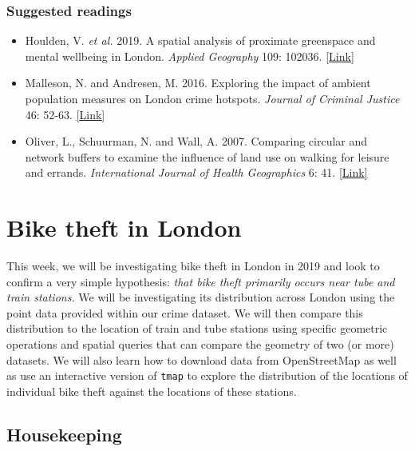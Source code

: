 \documentclass[
]{book}
\providecommand{\tightlist}{%
  \setlength{\itemsep}{0pt}\setlength{\parskip}{0pt}}
\begin{document}
\hypertarget{suggested-readings-5}{%
\subsubsection*{Suggested readings}\label{suggested-readings-5}}

\begin{itemize}
\tightlist
\item
  Houlden, V. \emph{et al.} 2019. A spatial analysis of proximate greenspace and mental wellbeing in London. \emph{Applied Geography} 109: 102036. \href{https://doi.org/10.1016/j.apgeog.2019.102036}{{[}Link{]}}
\item
  Malleson, N. and Andresen, M. 2016. Exploring the impact of ambient population measures on London crime hotspots. \emph{Journal of Criminal Justice} 46: 52-63. \href{https://doi.org/10.1016/j.jcrimjus.2016.03.002}{{[}Link{]}}
\item
  Oliver, L., Schuurman, N. and Wall, A. 2007. Comparing circular and network buffers to examine the influence of land use on walking for leisure and errands. \emph{International Journal of Health Geographics} 6: 41. \href{https://doi.org/10.1186/1476-072X-6-41}{{[}Link{]}}
\end{itemize}

\hypertarget{bike-theft-w06}{%
\section{Bike theft in London}\label{bike-theft-w06}}

This week, we will be investigating bike theft in London in 2019 and look to confirm a very simple hypothesis: \emph{that bike theft primarily occurs near tube and train stations.} We will be investigating its distribution across London using the point data provided within our crime dataset. We will then compare this distribution to the location of train and tube stations using specific geometric operations and spatial queries that can compare the geometry of two (or more) datasets. We will also learn how to download data from OpenStreetMap as well as use an interactive version of \texttt{tmap} to explore the distribution of the locations of individual bike theft against the locations of these stations.

\hypertarget{housekeeping-w06}{%
\subsection{Housekeeping}\label{housekeeping-w06}}
\end{document}

